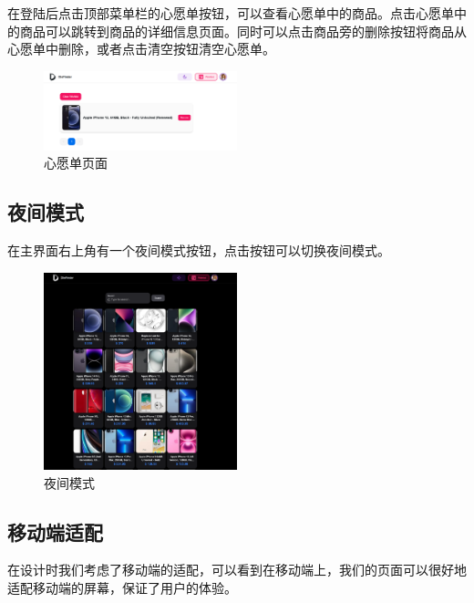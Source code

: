 在登陆后点击顶部菜单栏的心愿单按钮，可以查看心愿单中的商品。点击心愿单中的商品可以跳转到商品的详细信息页面。同时可以点击商品旁的删除按钮将商品从心愿单中删除，或者点击清空按钮清空心愿单。

\begin{figure}[H]
\centering
\includegraphics[width=0.5\textwidth]{assets/report/wishlist_page.png}
\caption{心愿单页面}
\end{figure}

\subsection{夜间模式}

在主界面右上角有一个夜间模式按钮，点击按钮可以切换夜间模式。

\begin{figure}[H]
\centering
\includegraphics[width=0.5\textwidth]{assets/report/night_mode.png}
\caption{夜间模式}
\end{figure}

\subsection{移动端适配}

在设计时我们考虑了移动端的适配，可以看到在移动端上，我们的页面可以很好地适配移动端的屏幕，保证了用户的体验。

